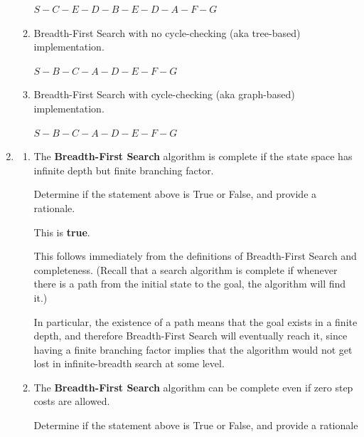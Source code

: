 \begin{enumerate}
\begin{enumerate}
        \begin{solution}
            $S - C - E - D - B - E - D - A - F - G$
        \end{solution}

        \item Breadth-First Search with no cycle-checking (aka tree-based) implementation.

        \begin{solution}
            $S - B - C - A - D - E - F - G$
        \end{solution}

        \item Breadth-First Search with cycle-checking (aka graph-based) implementation.

        \begin{solution}
            $S - B - C - A - D - E - F - G$
        \end{solution}
    \end{enumerate}

    \item \begin{enumerate}
        \item The \textbf{Breadth-First Search} algorithm is complete if the state space has infinite depth but finite branching factor.

        Determine if the statement above is True or False, and provide a rationale.

        \begin{solution}
            This is \textbf{true}.

            This follows immediately from the definitions of Breadth-First Search and completeness. (Recall that a search algorithm is complete if whenever there is a path from the initial state to the goal, the algorithm will find it.)

            In particular, the existence of a path means that the goal exists in a finite depth, and therefore Breadth-First Search will eventually reach it, since having a finite branching factor implies that the algorithm would not get lost in infinite-breadth search at some level.
        \end{solution}

        \item The \textbf{Breadth-First Search} algorithm can be complete even if zero step costs are allowed.

        Determine if the statement above is True or False, and provide a rationale


\end{enumerate}
\end{enumerate}
